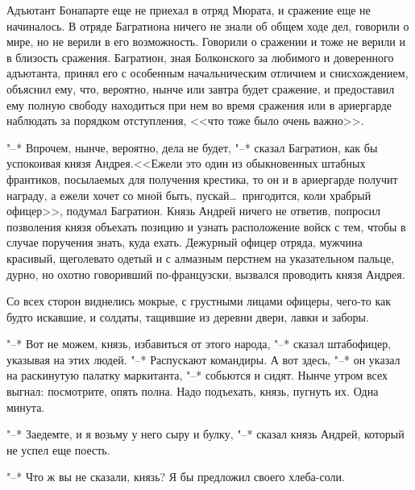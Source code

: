 \documentclass[a4paper, 12pt]{article}
\begin{document}
    \fontsize{14pt}{14pt}\selectfont
    Адъютант Бонапарте еще не приехал в отряд Мюрата, и сражение
    еще не начиналось. В отряде Багратиона ничего не знали об общем ходе
    дел, говорили о мире, но не верили в его возможность. Говорили о сражении и тоже не верили и в близость сражения. Багратион, зная Болконского за любимого и доверенного адъютанта, принял его с особенным
    начальническим отличием и снисхождением, объяснил ему, что, вероятно, нынче или завтра будет сражение, и предоставил ему полную свободу
    находиться при нем во время сражения или в ариергарде наблюдать за
    порядком отступления, <<что тоже было очень важно>>.

    "--* Впрочем, нынче, вероятно, дела не будет, "--* сказал Багратион, как
    бы успокоивая князя Андрея.<<Ежели это один из обыкновенных штабных франтиков, посылаемых для получения крестика, то он и в ариергарде получит награду, а ежели хочет со мной быть, пускай\ldots~пригодится, коли храбрый офицер>>, подумал Багратион. 
    Князь Андрей ничего не ответив, попросил позволения князя объехать позицию и узнать расположение войск с тем, чтобы в случае поручения знать, куда ехать.
    Дежурный офицер отряда, мужчина красивый, щеголевато одетый и с
    алмазным перстнем на указательном пальце, дурно, но охотно говоривший по-французски, вызвался проводить князя Андрея.
    
    Со всех сторон виднелись мокрые, с грустными лицами офицеры,
    чего-то как будто искавшие, и солдаты, тащившие из деревни двери,
    лавки и заборы.
    
    "--* Вот не можем, князь, избавиться от этого народа, "--* сказал штабофицер, указывая на этих людей. "--* Распускают командиры. А вот здесь,
    "--* он указал на раскинутую палатку маркитанта, "--* собьются и сидят.
    Нынче утром всех выгнал: посмотрите, опять полна. Надо подъехать,
    князь, пугнуть их. Одна минута.
    
    "--* Заедемте, и я возьму у него сыру и булку, "--* сказал князь Андрей,
    который не успел еще поесть.
    
    "--* Что ж вы не сказали, князь? Я бы предложил своего хлеба-соли.
\end{document}
